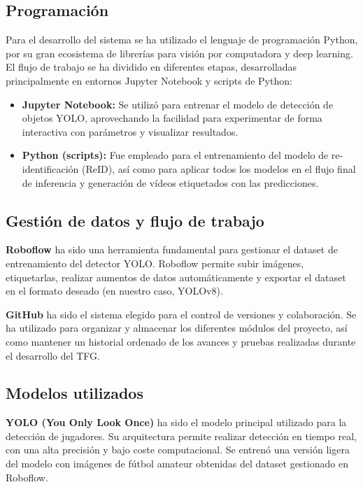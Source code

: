 \documentclass[12pt, a4paper, twoside]{article}
\begin{document}
	\subsection{Programación}
	
	Para el desarrollo del sistema se ha utilizado el lenguaje de programación Python, por su gran ecosistema de librerías para visión por computadora y deep learning. El flujo de trabajo se ha dividido en diferentes etapas, desarrolladas principalmente en entornos Jupyter Notebook y scripts de Python:
	
	\begin{itemize}
		\item \textbf{Jupyter Notebook:} Se utilizó para entrenar el modelo de detección de objetos YOLO, aprovechando la facilidad para experimentar de forma interactiva con parámetros y visualizar resultados.
		\item \textbf{Python (scripts):} Fue empleado para el entrenamiento del modelo de re-identificación (ReID), así como para aplicar todos los modelos en el flujo final de inferencia y generación de vídeos etiquetados con las predicciones.
	\end{itemize}
	
	\subsection{Gestión de datos y flujo de trabajo}
	
	\textbf{Roboflow} ha sido una herramienta fundamental para gestionar el dataset de entrenamiento del detector YOLO. Roboflow permite subir imágenes, etiquetarlas, realizar aumentos de datos automáticamente y exportar el dataset en el formato deseado (en nuestro caso, YOLOv8).
	
	\textbf{GitHub} ha sido el sistema elegido para el control de versiones y colaboración. Se ha utilizado para organizar y almacenar los diferentes módulos del proyecto, así como mantener un historial ordenado de los avances y pruebas realizadas durante el desarrollo del TFG.
	
	\subsection{Modelos utilizados}
	
	\textbf{YOLO (You Only Look Once)} ha sido el modelo principal utilizado para la detección de jugadores. Su arquitectura permite realizar detección en tiempo real, con una alta precisión y bajo coste computacional. Se entrenó una versión ligera del modelo con imágenes de fútbol amateur obtenidas del dataset gestionado en Roboflow.
	
\end{document}
